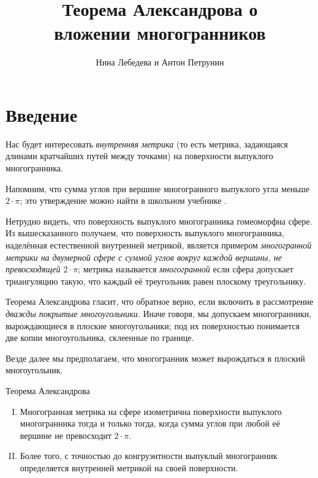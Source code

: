 \documentclass[oneside,a4paper]{article}
\begin{document}

\title{Теорема Александрова о\\ вложении многогранников}
\author{Нина Лебедева и Антон Петрунин}
\date{}
\maketitle

\section{Введение}

Нас будет интересовать \emph{внутренняя метрика} (то есть метрика, задающаяся длинами кратчайших путей между точками) на поверхности выпуклого многогранника.

Напомним, что сумма углов при вершине многогранного выпуклого угла меньше $2\cdot \pi$; 
это утверждение можно найти в школьном учебнике \cite[§~325]{kiselyov}.

Нетрудно видеть, что поверхность выпуклого многогранника гомеоморфна сфере.
Из вышесказанного получаем, что поверхность выпуклого многогранника, наделённая естественной внутренней метрикой,
является примером \emph{многогранной метрики на двумерной сфере с суммой углов вокруг каждой вершины, не превосходящей $2\cdot\pi$}; 
метрика называется \emph{многогранной} если сфера допускает триангуляцию такую, что каждый её треугольник равен плоскому треугольнику.

Теорема Александрова гласит, что обратное верно, если включить в рассмотрение \emph{дважды покрытые многоугольники}.
Иначе говоря, мы допускаем многогранники, вырождающиеся в плоские многоугольники;
под их поверхностью понимается две копии многоугольника, склеенные по границе.

Везде далее мы предполагаем, что многогранник может вырождаться в плоский многоугольник.

\begin{thm}{Теорема Александрова}
\begin{enumerate}[I.]
\item\label{thm:exist} Многогранная метрика на сфере изометрична поверхности выпуклого многогранника тогда и только тогда, когда сумма углов при любой её вершине не превосходит $2\cdot\pi$.

\item\label{thm:unique}
Более того, с точностью до конгруэнтности выпуклый многогранник определяется внутренней метрикой на своей поверхности.
\end{enumerate}

\end{thm}
\end{document}
